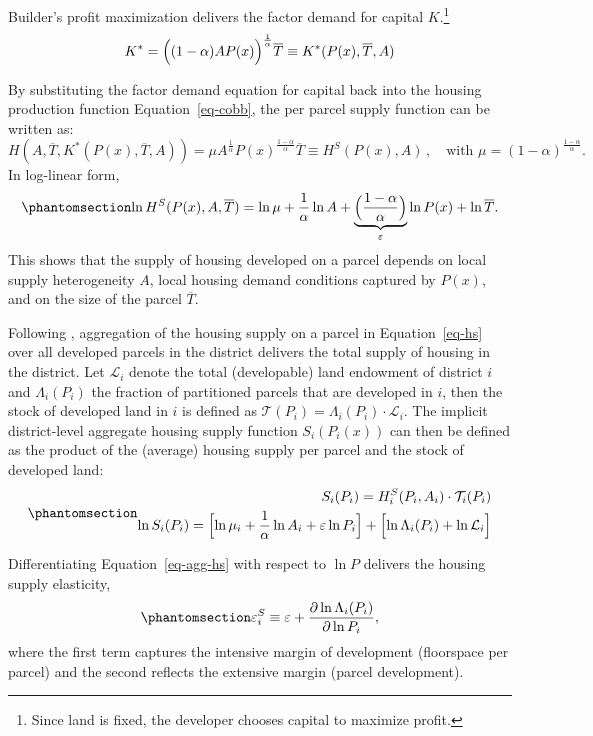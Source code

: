 \documentclass[
  12pt,
]{article}
\begin{document}
Builder's profit maximization delivers the factor demand for capital
\(K\).\footnote{Since land is fixed, the developer chooses capital to
  maximize profit.} \[
 K^* = \Bigl((1-\alpha)AP(x)\Bigr)^{\frac{1}{\alpha}}\overline{T}\equiv K^*(P(x), \overline{T}, A) 
\]

By substituting the factor demand equation for capital back into the
housing production function Equation~\ref{eq-cobb}, the per parcel
supply function can be written as: \[
H(A, \overline{T}, K^*(P(x), \overline{T}, A))=\mu A^{\frac{1}{\alpha}}{P(x)}^{\frac{1-\alpha}{\alpha}}\overline{T} \equiv H^S(P(x), A)\,,\quad \text{with } \mu = (1-\alpha)^{\frac{1-\alpha}{\alpha}}.
\] In log-linear form, \begin{equation}\phantomsection\label{eq-hs}{ 
\ln H^S(P(x), A, \overline{T}) = \ln \mu + \frac{1}{\alpha}\ln A + \underbrace{\Bigl(\frac{1-\alpha}{\alpha}\Bigr)}_{\varepsilon}\ln P(x) + \ln \overline{T}.
}\end{equation} This shows that the supply of housing developed on a
parcel depends on local supply heterogeneity \(A\), local housing demand
conditions captured by \(P(x)\), and on the size of the parcel
\(\overline{T}\).

Following \citet{baum-snow_han_2019}, aggregation of the housing supply
on a parcel in Equation~\ref{eq-hs} over all developed parcels in the
district delivers the total supply of housing in the district. Let
\(\mathcal{L}_{i}\) denote the total (developable) land endowment of
district \(i\) and \(\Lambda_i (P_i)\) the fraction of partitioned
parcels that are developed in \(i\), then the stock of developed land in
\(i\) is defined as
\(\mathcal{T}(P_i) = \Lambda_i(P_i) \cdot \mathcal{L}_{i}\). The
implicit district-level aggregate housing supply function
\(S_i(P_i(x))\) can then be defined as the product of the (average)
housing supply per parcel and the stock of developed land:
\begin{equation}\phantomsection\label{eq-agg-hs}{
\begin{aligned}
S_i(P_i) = H_i^S(P_i, A_i)\cdot \mathcal{T}_{i}(P_i)\\ 
\ln S_i(P_i) = \Bigl[\ln \mu_i + \frac{1}{\alpha}\ln A_i + \varepsilon\ln P_i \Bigr]+ \Bigl[\ln\Lambda_i(P_i) + \ln\mathcal{L}_i\Bigr]
\end{aligned} 
}\end{equation}

Differentiating Equation~\ref{eq-agg-hs} with respect to \(\ln P\)
delivers the housing supply elasticity,
\begin{equation}\phantomsection\label{eq-elasticity}{
\varepsilon^S_{i} \equiv \varepsilon + \frac{\partial \ln\Lambda_i(P_i)}{\partial \ln P_i},
}\end{equation} where the first term captures the intensive margin of
development (floorspace per parcel) and the second reflects the
extensive margin (parcel development).
\end{document}
